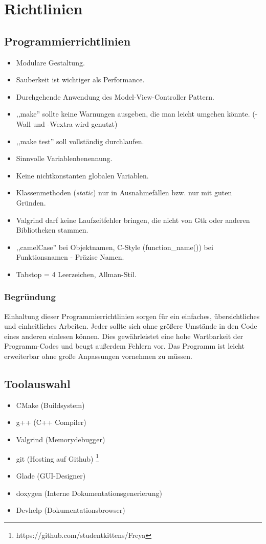 \chapter{Richtlinien}
\section{Programmierrichtlinien}
\renewcommand{\labelitemi}{•}
\begin{itemize}
\item Modulare Gestaltung.
\item Sauberkeit ist wichtiger als Performance.
\item Durchgehende Anwendung des Model-View-Controller Pattern.
\item ,,make'' sollte keine Warnungen ausgeben, die man leicht umgehen könnte. (-Wall und -Wextra wird genutzt)
\item ,,make test'' soll vollständig durchlaufen.
\item Sinnvolle Variablenbenennung.
\item Keine nichtkonstanten globalen Variablen.
\item Klassenmethoden (\emph{static}) nur in Ausnahmefällen bzw. nur mit guten Gründen.
\item Valgrind darf keine Laufzeitfehler bringen, die nicht von Gtk oder anderen Bibliotheken stammen.
\item ,,camelCase'' bei Objektnamen, C-Style (function\_name()) bei Funktionsnamen - Präzise Namen.
\item Tabstop = 4 Leerzeichen, Allman-Stil.
\end{itemize}
\subsection{Begründung}
Einhaltung dieser Programmierrichtlinien sorgen für ein einfaches, übersichtliches und einheitliches Arbeiten.
Jeder sollte sich ohne größere Umstände in den Code eines anderen einlesen können. Dies gewährleistet eine
hohe Wartbarkeit der Programm-Codes und beugt außerdem Fehlern vor. Das Programm ist leicht
erweiterbar ohne große Anpassungen vornehmen zu müssen.
\section{Toolauswahl}
\begin{itemize}
\item CMake (Buildsystem)
\item g++ (C++ Compiler)
\item Valgrind (Memorydebugger)
\item git (Hosting auf Github) \footnote{https://github.com/studentkittens/Freya}
\item Glade (GUI-Designer)
\item doxygen  (Interne Dokumentationsgenerierung)
\item Devhelp (Dokumentationsbrowser)
\end{itemize}
